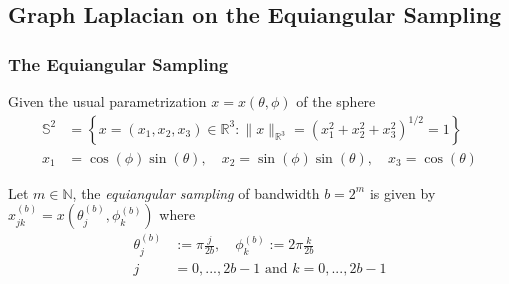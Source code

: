 \subsection{Graph Laplacian on the Equiangular Sampling}
\label{sec:Chapter3: Heat Kernel Graph Laplacian on the Equiangular Sampling}

\subsubsection{The Equiangular Sampling}

Given the usual parametrization $x = x(\theta, \phi)$ of the sphere
\begin{align*}
	\mathbb{S}^{2}&=\left\{x=\left(x_{1}, x_{2}, x_{3}\right) \in \mathbb{R}^{3} :\|x\|_{\mathbb{R}^{3}}=\left(x_{1}^{2}+x_{2}^{2}+x_{3}^{2}\right)^{1 / 2}=1\right\}\\
	x_{1}&=\cos (\phi) \sin (\theta), \quad x_{2}=\sin (\phi) \sin (\theta), \quad x_{3}=\cos (\theta)
\end{align*}

Let $m\in\mathbb N$, the \textit{equiangular sampling} of bandwidth $b=2^m$ is given by 
$
x_{j k}^{(b)}=x\left(\theta_{j}^{(b)}, \phi_{k}^{(b)}\right)
$
where
\begin{align*}
	\theta_{j}^{(b)} &:=\pi \frac{j}{2 b}, \quad \phi_{k}^{(b)} :=2 \pi \frac{k}{2 b}\\
	j&=0, ..., 2b-1 \text{ and }k=0, ..., 2b-1 
\end{align*}

